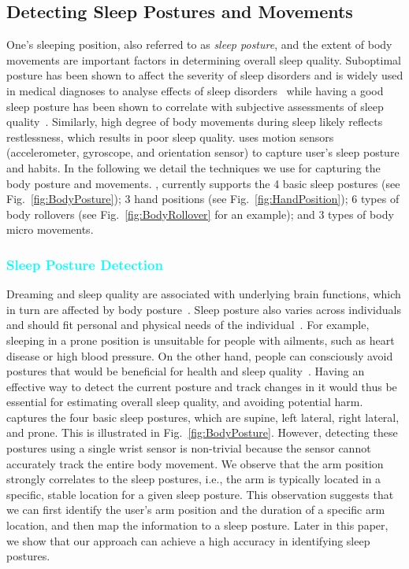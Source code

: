 \subsection{Detecting Sleep Postures and Movements}

One's sleeping position, also referred to as {\em sleep posture}, and the extent of body movements are important factors in determining
overall sleep quality. Suboptimal posture has been shown to affect the severity of sleep disorders and is widely used in medical diagnoses
to analyse effects of sleep disorders~\cite{oksenberg1998effect,eiseman2012impact} while having a good sleep posture has been shown to
correlate with subjective assessments of sleep quality~\cite{dekoninck83sleep}. Similarly, high degree of body movements during sleep
likely reflects restlessness, which results in poor sleep quality. {\systemname} uses motion sensors (accelerometer, gyroscope, and
orientation sensor) to capture user's sleep posture and habits. In the following we detail the techniques we use for capturing the body
posture and movements.  {\systemname}, currently supports the 4 basic sleep postures (see Fig.~\ref{fig:BodyPosture}); 3 hand positions
(see Fig.~\ref{fig:HandPosition}); 6 types of body rollovers (see Fig.~\ref{fig:BodyRollover} for an example); and 3 types of body micro
movements. %


\subsubsection{\textcolor{cyan}{Sleep Posture Detection}\label{sec:sleeppdet}}

Dreaming and sleep quality are associated with underlying brain functions, which in turn are affected by body posture~\cite{posture2004}.
Sleep posture also varies across individuals and should fit personal and physical needs of the individual~\cite{posture2016,posture2017}.
For example, sleeping in a prone position is unsuitable for people with ailments, such as heart disease or high blood pressure. On the
other hand, people can consciously avoid postures that would be beneficial for health and sleep quality~\cite{posture2015}. Having an
effective way to detect the current posture and track changes in it would thus be essential for estimating overall sleep quality, and
avoiding potential harm. \systemname captures the four basic sleep postures, which are supine, left lateral, right lateral, and prone. This
is illustrated in Fig.~\ref{fig:BodyPosture}. However, detecting these postures using a single wrist sensor is non-trivial because the
sensor cannot accurately track the entire body movement. We observe that the arm position strongly correlates to the sleep postures, i.e.,
the arm is typically located in a specific, stable location for a given sleep posture. This observation suggests that we can first identify
the user's arm position and the duration of a specific arm location, and then map the information to a sleep posture. Later in this paper,
we show that our approach can achieve a high accuracy in identifying sleep postures.





